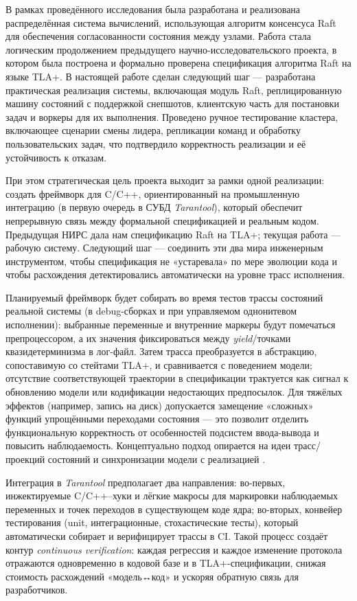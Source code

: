 \conclusion

В рамках проведённого исследования была разработана и реализована
распределённая система вычислений, использующая алгоритм консенсуса Raft для
обеспечения согласованности состояния между узлами. Работа стала логическим
продолжением предыдущего научно-исследовательского проекта, в котором была
построена и формально проверена спецификация алгоритма Raft на языке TLA+. В
настоящей работе сделан следующий шаг — разработана практическая реализация
системы, включающая модуль Raft, реплицированную машину состояний с поддержкой
снепшотов, клиентскую часть для постановки задач и воркеры для их выполнения.
Проведено ручное тестирование кластера, включающее сценарии смены лидера,
репликации команд и обработку пользовательских задач, что подтвердило
корректность реализации и её устойчивость к отказам.

При этом стратегическая цель проекта выходит за рамки одной реализации: создать
фреймворк для C/C++, ориентированный на промышленную интеграцию (в первую
очередь в СУБД \textit{Tarantool}), который обеспечит непрерывную связь между
формальной спецификацией и реальным кодом. Предыдущая НИРС дала нам
спецификацию Raft на TLA+; текущая работа — рабочую систему. Следующий шаг —
соединить эти два мира инженерным инструментом, чтобы спецификация не
«устаревала» по мере эволюции кода и чтобы расхождения детектировались
автоматически на уровне трасс исполнения.

Планируемый фреймворк будет собирать во время тестов трассы состояний реальной
системы (в debug-сборках и при управляемом однонитевом исполнении): выбранные
переменные и внутренние маркеры будут помечаться препроцессором, а их значения
фиксироваться между \emph{yield}/точками квазидетерминизма в лог-файл. Затем
трасса преобразуется в абстракцию, сопоставимую со стейтами TLA+, и
сравнивается с поведением модели; отсутствие соответствующей траектории в
спецификации трактуется как сигнал к обновлению модели или кодификации
недостающих предпосылок. Для тяжёлых эффектов (например, запись на диск)
допускается замещение «сложных» функций упрощёнными переходами состояния — это
позволит отделить функциональную корректность от особенностей подсистем
ввода-вывода и повысить наблюдаемость. Концептуально подход опирается на идеи
трасс/проекций состояний и синхронизации модели с реализацией
\cite{trace_pn,tlacoverage,merz2024}.

Интеграция в \textit{Tarantool} предполагает два направления: во-первых,
инжектируемые C/C++–хуки и лёгкие макросы для маркировки наблюдаемых переменных
и точек переходов в существующем коде ядра; во-вторых, конвейер тестирования
(unit, интеграционные, стохастические тесты), который автоматически собирает и
верифицирует трассы в CI. Такой процесс создаёт контур \emph{continuous
verification}: каждая регрессия и каждое изменение протокола отражаются
одновременно в кодовой базе и в TLA+-спецификации, снижая стоимость расхождений
«модель↔код» и ускоряя обратную связь для разработчиков.

